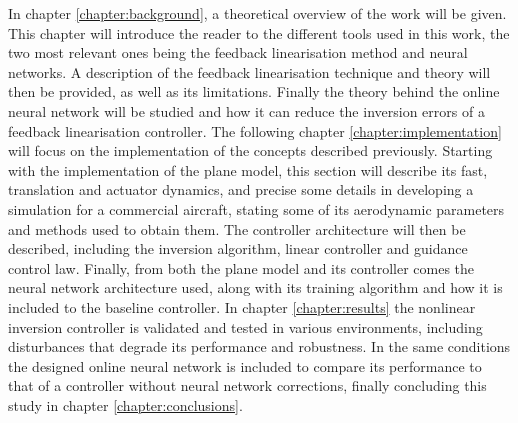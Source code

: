 In chapter \ref{chapter:background}, a theoretical overview of the work will be given. This chapter will introduce the reader to the different tools used in this work, the two most relevant ones being the feedback linearisation method and neural networks. A description of the feedback linearisation technique and theory will then be provided, as well as its limitations. Finally the theory behind the online neural network will be studied and how it can reduce the inversion errors of a feedback linearisation controller.
The following chapter \ref{chapter:implementation} will focus on the implementation of the concepts described previously. Starting with the implementation of the plane model, this section will describe its fast, translation and actuator dynamics, and precise some details in developing a simulation for a commercial aircraft, stating some of its aerodynamic parameters and methods used to obtain them. The controller architecture will then be described, including the inversion algorithm, linear controller and guidance control law. Finally, from both the plane model and its controller comes the neural network architecture used, along with its training algorithm and how it is included to the baseline controller. In chapter \ref{chapter:results} the nonlinear inversion controller is validated and tested in various environments, including disturbances that degrade its performance and robustness. In the same conditions the designed online neural network is included to compare its performance to that of a controller without neural network corrections, finally concluding this study in chapter \ref{chapter:conclusions}.

